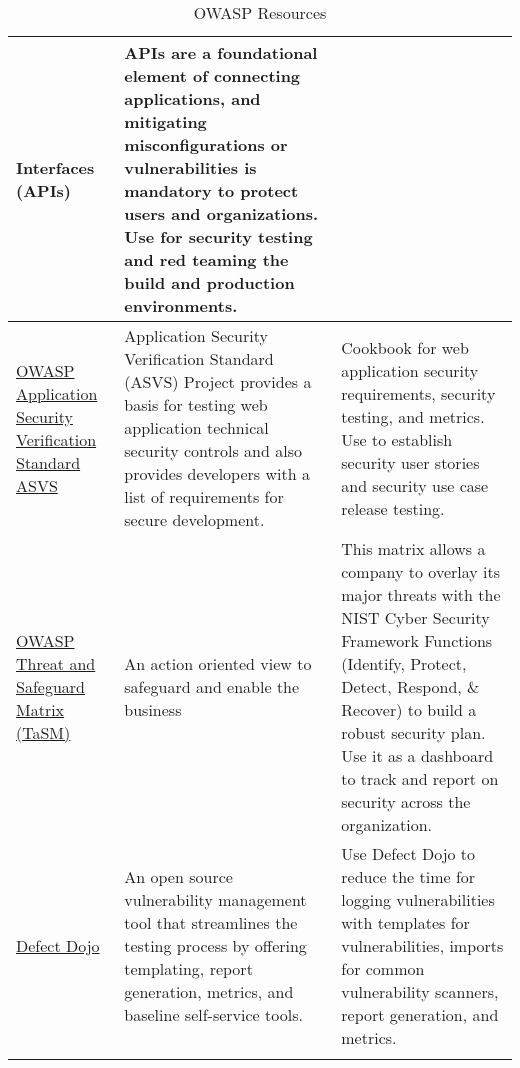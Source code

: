 \begin{longtable}[c]{|p{}|p{}|p{}|}
  Interfaces (APIs) &
  APIs are a foundational element of connecting applications, and mitigating
  misconfigurations or vulnerabilities is mandatory to protect users and
  organizations. Use for security testing and red teaming the build and
  production environments. \\
  \hline
  \href{https://owasp.org/www-project-application-security-verification-standard/}{OWASP Application Security Verification Standard ASVS} &
  Application Security Verification Standard (ASVS) Project provides a basis
  for testing web application technical security controls and also provides
  developers with a list of requirements for secure development. &
  Cookbook for web application security requirements, security testing, and
  metrics. Use to establish security user stories and security use case release
  testing. \\
  \hline
  \href{https://owasp.org/www-project-threat-and-safeguard-matrix/}{OWASP Threat and Safeguard Matrix (TaSM)} &
  An action oriented view to safeguard and enable the business &
  This matrix allows a company to overlay its major threats with the NIST Cyber
  Security Framework Functions (Identify, Protect, Detect, Respond, \& Recover)
  to build a robust security plan. Use it as a dashboard to track and report on
  security across the organization. \\
  \hline
  \href{https://www.defectdojo.com/}{Defect Dojo} &
  An open source vulnerability management tool that streamlines the testing
  process by offering templating, report generation, metrics, and baseline
  self-service tools. &
  Use Defect Dojo to reduce the time for logging vulnerabilities with templates
  for vulnerabilities, imports for common vulnerability scanners, report
  generation, and metrics. \\
  \hline
  \caption{OWASP Resources}
  \label{tab:owasp-resources}
\end{longtable}
